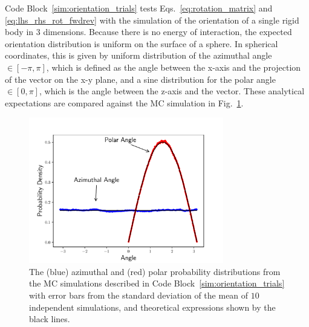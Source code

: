 \documentclass[
  9pt,
  bestpractices,
]{livecoms}
\begin{document}
Code Block~\ref{sim:orientation_trials} tests Eqs.~\ref{eq:rotation_matrix} and \ref{eq:lhs_rhs_rot_fwdrev} with the simulation of the orientation of a single rigid body in $3$ dimensions.
Because there is no energy of interaction, the expected orientation distribution is uniform on the surface of a sphere.
In spherical coordinates, this is given by uniform distribution of the azimuthal angle $\in [-\pi,\pi]$, which is defined as the angle between the x-axis and the projection of the vector on the x-y plane, and a sine distribution for the polar angle $\in [0,\pi]$, which is the angle between the z-axis and the vector.
These analytical expectations are compared against the MC simulation in Fig.~\ref{fig:orientation_trials}.

\begin{figure}

\end{figure}

\begin{figure}
\begin{centering}
\includegraphics[width=8.5cm]{../figures/orientation_trials.pdf}
\caption{
  The (blue) azimuthal and (red) polar probability distributions from the MC simulations described in Code Block~\ref{sim:orientation_trials} with error bars from the standard deviation of the mean of $10$ independent simulations, and theoretical expressions shown by the black lines.
\label{fig:orientation_trials}
}
\end{centering}
\end{figure}
\end{document}
